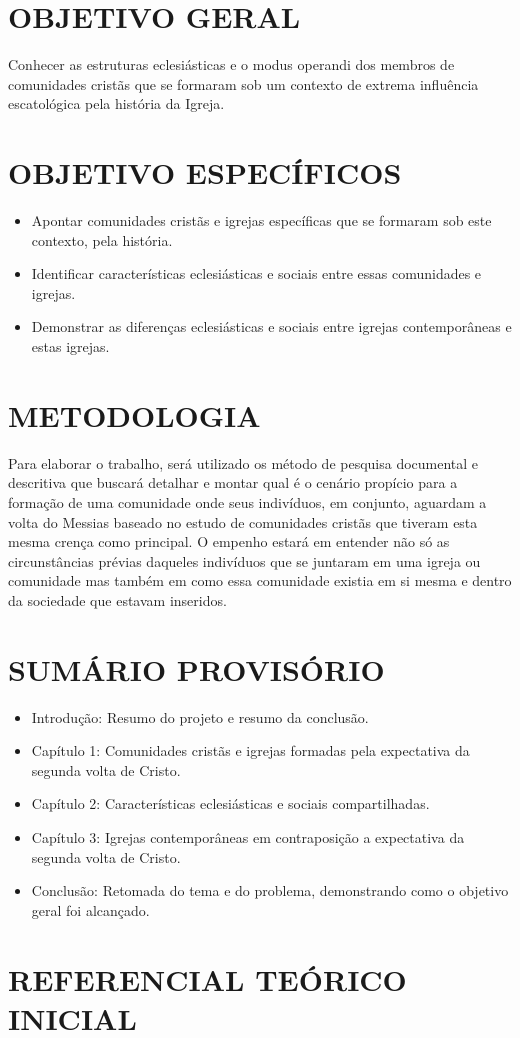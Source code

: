 \documentclass[
    article,            %
	12pt,				%
	oneside,			%
	a4paper,			%
	chapter=TITLE,		%
	section=TITLE,		%
	english,			%
	french,				%
	spanish,			%
	brazil				%
	]{abntex2}
\begin{document}
\section*{OBJETIVO GERAL}
Conhecer as estruturas eclesiásticas e o modus operandi dos membros de comunidades cristãs que se formaram sob um contexto de extrema influência escatológica pela história da Igreja.

\section*{OBJETIVO ESPECÍFICOS}
\begin{itemize}
    \item Apontar comunidades cristãs e igrejas específicas que se formaram sob este contexto, pela história.
    \item Identificar características eclesiásticas e sociais entre essas comunidades e igrejas.
    \item Demonstrar as diferenças eclesiásticas e sociais entre igrejas contemporâneas e estas igrejas.
\end{itemize}

\section*{METODOLOGIA}
Para elaborar o trabalho, será utilizado os método de pesquisa documental e descritiva que buscará detalhar e montar qual é o cenário propício para a formação de uma comunidade onde seus indivíduos, em conjunto, aguardam a volta do Messias baseado no estudo de comunidades cristãs que tiveram esta mesma crença como principal. O empenho estará em entender não só as circunstâncias prévias daqueles indivíduos que se juntaram em uma igreja ou comunidade mas também em como essa comunidade existia em si mesma e dentro da sociedade que estavam inseridos.

\section*{SUMÁRIO PROVISÓRIO}
\begin{itemize}
    \item Introdução: Resumo do projeto e resumo da conclusão.
    \item Capítulo 1: Comunidades cristãs e igrejas formadas pela expectativa da segunda volta de Cristo.
    \item Capítulo 2: Características eclesiásticas e sociais compartilhadas.
    \item Capítulo 3: Igrejas contemporâneas em contraposição a expectativa da segunda volta de Cristo.
    \item Conclusão: Retomada do tema e do problema, demonstrando como o objetivo geral foi alcançado.
\end{itemize}

\section*{REFERENCIAL TEÓRICO INICIAL}
\nocite{CAIRNS}
\nocite{DOOL}
\nocite{WEINLICK}
\nocite{ATWOOD}
\nocite{LOPES}


\renewcommand{\bibname}{{}}

\end{document}
